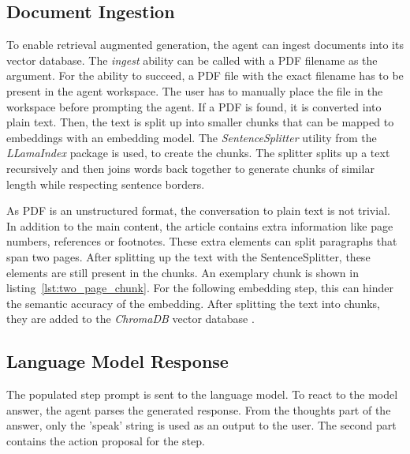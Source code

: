 \documentclass[../main.tex]{subfiles}
\begin{document}
\subsection{Document Ingestion}

To enable retrieval augmented generation,
the agent can ingest documents into its vector database.
The \emph{ingest} ability can be called with a PDF filename as the argument.
For the ability to succeed, a PDF file with the exact filename has to be present
in the agent workspace.
The user has to manually place the file in the workspace before prompting the agent.
If a PDF is found, it is converted into plain text.
Then, the text is split up into smaller chunks that can be mapped to embeddings
with an embedding model.
The \emph{SentenceSplitter} utility from the \emph{LLamaIndex} package \cite{zotero-255} is used,
to create the chunks.
The splitter splits up a text recursively and then joins words back together to
generate chunks of similar length while respecting sentence borders.



As PDF is an unstructured format, the conversation to plain text is not trivial.
In addition to the main content, the article contains extra information like page numbers,
references or footnotes.
These extra elements can split paragraphs that span two pages.
After splitting up the text with the SentenceSplitter, these elements are still
present in the chunks.
An exemplary chunk is shown in listing~\ref{lst:two_page_chunk}.
For the following embedding step,
this can hinder the semantic accuracy of the embedding.
After splitting the text into chunks, they are added to the \emph{ChromaDB}
vector database \cite{zotero-176}.

\subsection{Language Model Response}

The populated step prompt is sent to the language model.
To react to the model answer, the agent parses the generated response.
From the thoughts part of the answer, only the 'speak' string is used as an output to the user.
The second part contains the action proposal for the step.
\end{document}
